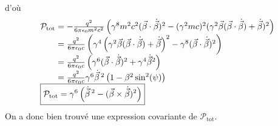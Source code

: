 d'où
$$
	\begin{array}{r@{\;}l}
		\mathcal{P}_\text{tot}&=-\frac{q^2}{6\pi\epsilon_0m^2c^2}\left(
			\gamma^8m^2c^2(\vec{\beta}\cdot\dot{\vec{\beta}})^2
			-(\gamma^2mc)^2(\gamma^2\vec{\beta}(\vec{\beta}\cdot\dot{\vec{\beta}})+\dot{\vec{\beta}})^2
			\right)\\
		&=\frac{q^2}{6\pi\epsilon_0c}\left(
			\gamma^4\left(\gamma^2\vec{\beta}(\vec{\beta}\cdot\dot{\vec{\beta}})+\dot{\vec{\beta}}\right)^2
			-\gamma^8(\vec{\beta}\cdot\dot{\vec{\beta}})^2\right)\\
		&=\frac{q^2}{6\pi\epsilon_0c}\left(\gamma^6(\vec{\beta}\cdot\dot{\vec{\beta}})^2
			+\gamma^4\dot{\vec{\beta}}^2\right)\\
		&=\frac{q^2}{6\pi\epsilon_0c}\gamma^6\dot{\vec{\beta}}\,^2\left(
			1-\beta^2\sin^2(\psi)\right)\\
		\multicolumn{2}{l}{\boxed{\mathcal{P}_\text{tot}=\gamma^6\left(\dot{\vec{\beta}}\,^2-
			(\vec{\beta}\times\dot{\vec{\beta}})^2\right)}}
	\end{array}
$$
On a donc bien trouvé une expression covariante de $\mathcal{P}_\text{tot}$.

